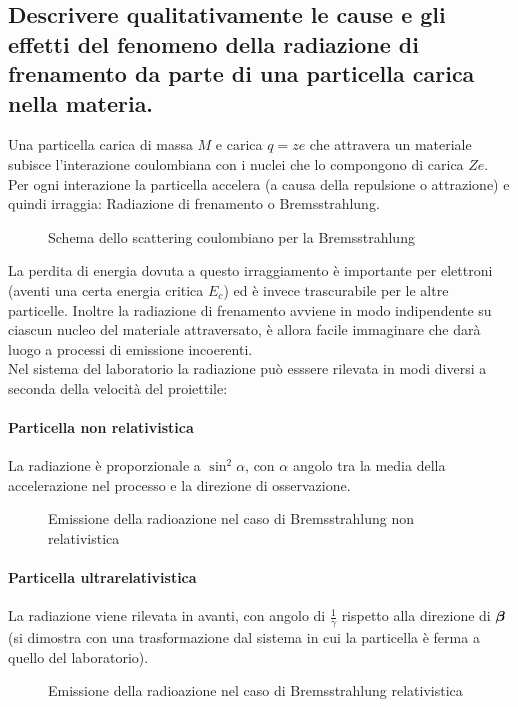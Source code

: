 \subsection[ Cause ed effetti della radiazione di frenamento]{Descrivere qualitativamente le cause e gli effetti del fenomeno della radiazione di frenamento da parte di una particella carica nella materia.
}\label{sec:4.a.9}
Una particella carica di massa $M$ e carica $q=ze$ che attravera un materiale subisce l'interazione coulombiana con i nuclei che lo compongono di carica $Ze$.\\
Per ogni interazione la particella accelera (a causa della repulsione o attrazione) e quindi irraggia: Radiazione di frenamento o Bremsstrahlung.
\begin{figure}[H]
    \centering
    \caption{Schema dello scattering coulombiano per la Bremsstrahlung}
    \label{fig:bremsstrahlung}
\end{figure}
La perdita di energia dovuta a questo irraggiamento è importante per elettroni (aventi una certa energia critica $E_{c}$) ed è invece trascurabile per le altre particelle. Inoltre la radiazione di frenamento avviene in modo indipendente su ciascun nucleo del materiale attraversato, è allora facile immaginare che darà luogo a processi di emissione incoerenti.\\
Nel sistema del laboratorio la radiazione può esssere rilevata in modi diversi a seconda della velocità del proiettile:
\paragraph{Particella non relativistica}%
La radiazione è proporzionale a $\sin^2\alpha$, con $\alpha$ angolo tra la media della accelerazione nel processo e la direzione di osservazione.
\begin{figure}[H]
    \centering
    \caption{Emissione della radioazione nel caso di Bremsstrahlung non relativistica}
    \label{fig:bremsstrahlung-non-relativistica}
\end{figure}
\paragraph{Particella ultrarelativistica}%
La radiazione viene rilevata in avanti, con angolo di $\frac{1}{\gamma}$ rispetto alla direzione di $\boldsymbol{\beta}$ (si dimostra con una trasformazione dal sistema in cui la particella è ferma a quello del laboratorio).
\begin{figure}[ht]
    \centering
    \caption{Emissione della radioazione nel caso di Bremsstrahlung relativistica}
    \label{fig:bremsstrahlung-relativistica}
\end{figure}

